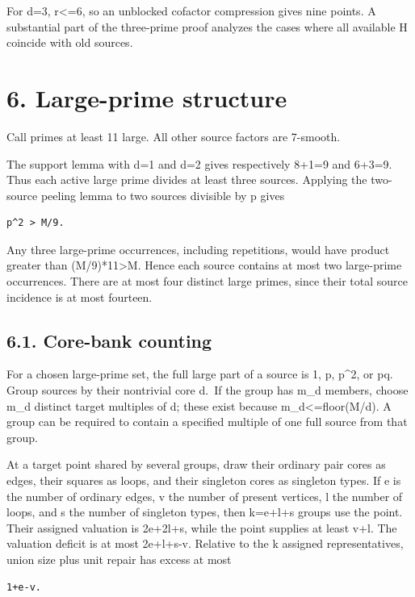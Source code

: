 \documentclass[11pt,a4paper]{article}
\begin{document}
For d=3, r\textless=6, so an unblocked cofactor compression gives nine
points. A substantial part of the three-prime proof analyzes the cases
where all available H coincide with old sources.

\section{6. Large-prime structure}\label{large-prime-structure}

Call primes at least 11 large. All other source factors are 7-smooth.

The support lemma with d=1 and d=2 gives respectively 8+1=9 and 6+3=9.
Thus each active large prime divides at least three sources. Applying
the two-source peeling lemma to two sources divisible by p gives

\begin{verbatim}
p^2 > M/9.
\end{verbatim}

Any three large-prime occurrences, including repetitions, would have
product greater than (M/9)*11\textgreater M. Hence each source contains
at most two large-prime occurrences. There are at most four distinct
large primes, since their total source incidence is at most fourteen.

\subsection{6.1. Core-bank counting}\label{core-bank-counting}

For a chosen large-prime set, the full large part of a source is 1, p,
p\^{}2, or pq. Group sources by their nontrivial core d.~If the group
has m\_d members, choose m\_d distinct target multiples of d; these
exist because m\_d\textless=floor(M/d). A group can be required to
contain a specified multiple of one full source from that group.

At a target point shared by several groups, draw their ordinary pair
cores as edges, their squares as loops, and their singleton cores as
singleton types. If e is the number of ordinary edges, v the number of
present vertices, l the number of loops, and s the number of singleton
types, then k=e+l+s groups use the point. Their assigned valuation is
2e+2l+s, while the point supplies at least v+l. The valuation deficit is
at most 2e+l+s-v. Relative to the k assigned representatives, union size
plus unit repair has excess at most

\begin{verbatim}
1+e-v.
\end{verbatim}
\end{document}
